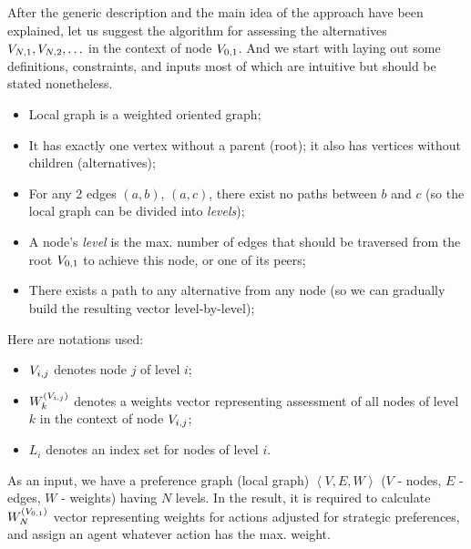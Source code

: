 After the generic description and the main idea of the approach have been explained, let us suggest the algorithm for
assessing the alternatives $V_{N,1}, V_{N,2},\ldots$ in the context of node $V_{0,1}$. And we start with laying out some definitions,
constraints, and inputs most of which are intuitive but should be stated nonetheless.

\begin{itemize}
    \item Local graph is a weighted oriented graph;
    \item It has exactly one vertex without a parent (root); it also has vertices without children (alternatives);
    \item For any 2 edges $(a,b)$, $(a,c)$, there exist no paths between $b$ and $c$ (so the local
        graph can be divided into \textit{levels});
    \item A node's \textit{level} is the max. number of edges that should be traversed from the root $V_{0,1}$ to
        achieve this node, or one of its peers;
    \item There exists a path to any alternative from any node (so we can gradually build the
        resulting vector level-by-level);
\end{itemize}

Here are notations used:

\begin{itemize}
    \item $V_{i,j}$ denotes node $j$ of level $i$;
    \item $W_{k}^{(V_{i,j})}$ denotes a weights vector representing assessment of all nodes of level
        $k$ in the context of node $V_{i,j}$;
    \item $L_i$ denotes an index set for nodes of level $i$.
\end{itemize}

As an input, we have a preference graph (local graph) $\left< V, E, W \right>$ ($V$ - nodes, $E$ - edges, $W$ - weights)
having $N$ levels. In the result, it is required to calculate $W_{N}^{(V_{0,1})}$ vector representing weights for
actions adjusted for strategic preferences, and assign an agent whatever action has the max. weight.
